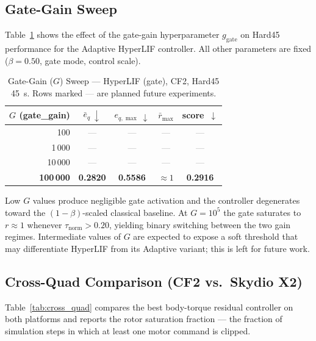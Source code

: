\documentclass[conference]{IEEEtran}
\newcommand{\TBD}{\textcolor{gray}{—}}
\begin{document}
\subsection{Gate-Gain Sweep}

Table~\ref{tab:gate_sweep} shows the effect of the gate-gain hyperparameter
$g_{\mathrm{gate}}$ on Hard45 performance for the Adaptive HyperLIF controller.
All other parameters are fixed ($\beta = 0.50$, gate mode, control scale).

\begin{table}[t]
  \centering
  \caption{Gate-Gain ($G$) Sweep — HyperLIF (gate), CF2, Hard45 \SI{45}{\second}.
    Rows marked \TBD{} are planned future experiments.}
  \label{tab:gate_sweep}
  \begin{tabular}{rcccc}
    \toprule
    $G$ (gate\_gain) &
    $\bar{e}_q~\downarrow$ &
    $e_{q,\max}~\downarrow$ &
    $\bar{r}_{\max}$ &
    score~$\downarrow$ \\
    \midrule
    100         & \TBD & \TBD & \TBD & \TBD \\
    1\,000      & \TBD & \TBD & \TBD & \TBD \\
    10\,000     & \TBD & \TBD & \TBD & \TBD \\
    \textbf{100\,000} & \textbf{0.2820} & \textbf{0.5586} & $\approx 1$ & \textbf{0.2916} \\
    \bottomrule
  \end{tabular}
\end{table}

Low $G$ values produce negligible gate activation and the controller
degenerates toward the $(1{-}\beta)$-scaled classical baseline.
At $G = 10^5$ the gate saturates to $r \approx 1$ whenever
$\tau_{\mathrm{norm}} > 0.20$, yielding binary switching between the two
gain regimes.
Intermediate values of $G$ are expected to expose a soft threshold that may
differentiate HyperLIF from its Adaptive variant; this is left for future work.

\subsection{Cross-Quad Comparison (CF2 vs.\ Skydio X2)}

Table~\ref{tab:cross_quad} compares the best body-torque residual controller
on both platforms and reports the rotor saturation fraction — the fraction of
simulation steps in which at least one motor command is clipped.
\end{document}
